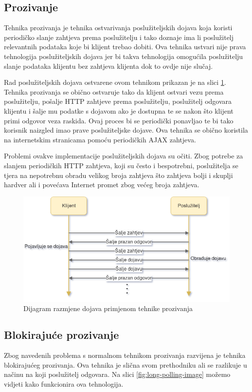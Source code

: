 \documentclass[times, utf8, zavrsni]{fer}
\begin{document}
\subsection{Prozivanje}
Tehnika prozivanja  je tehnika ostvarivanja poslužiteljskih dojava koja koristi periodičko slanje zahtjeva prema poslužitelju i tako doznaje ima li poslužitelj relevantnih podataka koje bi klijent trebao dobiti. Ova tehnika ustvari nije prava tehnologija poslužiteljskih dojava jer bi takva tehnologija omogućila poslužitelju slanje podataka klijentu bez zahtjeva klijenta dok to ovdje nije slučaj.

Rad poslužiteljskih dojava ostvarene ovom tehnikom prikazan je na slici \ref{fig:polling-image}. Tehnika prozivanja se obično ostvaruje tako da klijent ostvari vezu prema poslužitelju, pošalje HTTP zahtjeve prema poslužitelju, poslužitelj odgovara klijentu i šalje mu podatke s dojavom ako je dostupna te se nakon što klijent primi odgovor veza raskida. Ovaj proces bi se periodički ponavljao te bi tako korisnik naizgled imao prave poslužiteljske dojave. Ova tehnika se obično koristila na internetskim stranicama pomoću periodičkih AJAX zahtjeva. 

Problemi ovakve implementacije poslužiteljskih dojava su očiti. Zbog potrebe za slanjem periodičkih HTTP zahtjeva, koji su često i bespotrebni, poslužitelja se tjera na nepotrebnu obradu velikog broja zahtjeva što zahtjeva bolji i skuplji hardver ali i povećava Internet promet zbog većeg broja zahtjeva.

\begin{figure}[htb]
\centering
\includegraphics[width=\linewidth]{img/polling.png}
\caption{Dijagram razmjene dojava primjenom tehnike prozivanja}
\label{fig:polling-image}
\end{figure}

\subsection{Blokirajuće prozivanje}
Zbog navedenih problema s normalnom tehnikom prozivanja razvijena je tehnika blokirajućeg prozivanja. Ova tehnika je slična svom prethodniku ali se razlikuje u načinu na koji poslužitelj odgovara. Na slici \ref{fig:long-polling-image} možemo vidjeti kako funkcionira ova tehnologija. 
\end{document}
